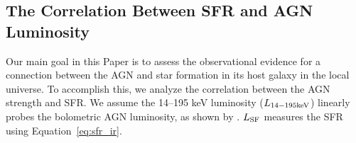 \documentclass[fleqn, usenatbib]{mnras}
\begin{document}
%
%
%
 
\subsection{The Correlation Between SFR and AGN Luminosity}
Our main goal in this Paper is to assess the observational evidence for a connection between the AGN and star formation in its host galaxy in the local universe. To accomplish this, we analyze the correlation between the AGN strength and SFR. We assume the 14--195 keV luminosity ($L_{\rm 14-195 keV}$) linearly probes the bolometric AGN luminosity, as shown by \citet{Winter:2012yq}. $L_{\rm SF}$ measures the SFR using Equation~\ref{eq:sfr_ir}.
\end{document}

